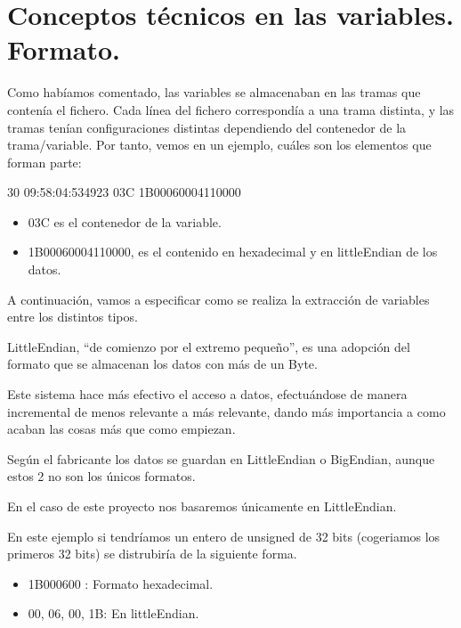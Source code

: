 
\section{Conceptos técnicos en las variables. Formato.}

Como habíamos comentado, las variables se almacenaban en las tramas que contenía el fichero.
Cada línea del fichero correspondía a una trama distinta, y las tramas tenían configuraciones distintas dependiendo del contenedor de la trama/variable.\cite{LITTLE}
Por tanto, vemos en un ejemplo, cuáles son los elementos que forman parte:

30 09:58:04:534923 03C 1B00060004110000
\begin{itemize}
	\item 03C es el contenedor de la variable.

	\item 1B00060004110000, es el contenido en hexadecimal y en littleEndian de los datos.

\end{itemize}
A continuación, vamos a especificar como se realiza la extracción de variables entre los distintos tipos.

LittleEndian, “de comienzo por el extremo pequeño”, es una adopción del formato que se almacenan los datos con más de un Byte. 

Este sistema hace más efectivo el acceso a datos, efectuándose de manera incremental de menos relevante a más relevante, dando más importancia a como acaban las cosas más que como empiezan. 


Según el fabricante los datos se guardan en LittleEndian o BigEndian, aunque estos 2 no son los únicos formatos.


En el caso de este proyecto nos basaremos únicamente en LittleEndian.


En este ejemplo si tendríamos un entero de unsigned de 32 bits (cogeriamos los primeros 32 bits) se distrubiría de la siguiente forma.

\begin{itemize}
	\item 1B000600 : Formato hexadecimal.

	\item 00, 06, 00, 1B: En littleEndian.

\end{itemize}


